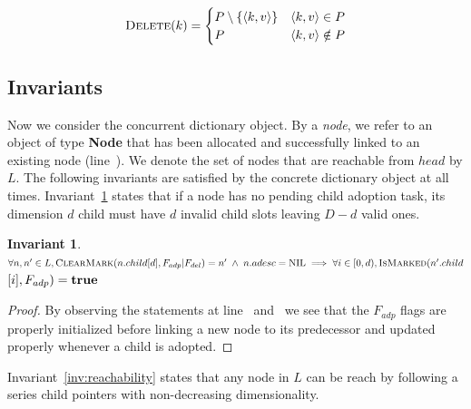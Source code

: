 \documentclass[10pt,conference,compsocconf]{IEEEtran}
\newtheorem{invariant}{Invariant}
\newcommand\NIL{\text{NIL}}
\newcommand\TRUE{\text{\textbf{true}}}
\begin{document}
\begin{gather}
    \label{eq:delete1}
    \textsc{Delete}(k)= \begin{cases}
        P \setminus \{\langle k,v \rangle\} & \langle k,v\rangle \in P\\
        P & \langle k,v\rangle \notin P
    \end{cases}
\end{gather}

\subsection{Invariants}
Now we consider the concurrent dictionary object. 
By a \emph{node}, we refer to an object of type \textbf{Node} that has been allocated and successfully linked to an existing node (line~). 
We denote the set of nodes that are reachable from $head$ by $L$. 
The following invariants are satisfied by the concrete dictionary object at all times. 
Invariant~\ref{inv:adpflag} states that if a node has no pending child adoption task, its dimension $d$ child must have $d$ invalid child slots leaving $D-d$ valid ones.

\begin{invariant} \label{inv:adpflag}
$\forall n,n' \in L,\textsc{ClearMark}(n.child[d],F_{adp}\linebreak|F_{del})=n'\;\land\;n.adesc=\NIL \implies \forall i \in [0,d), \textsc{IsMarked}(\linebreak n'.child$ $[i],F_{adp})=\TRUE$
\end{invariant}
\begin{proof}
    By observing the statements at line~ and~ we see that the $F_{adp}$ flags are properly initialized before linking a new node to its predecessor and updated properly whenever a child is adopted.
\end{proof}

Invariant~\ref{inv:reachability} states that any node in $L$ can be reach by following a series child pointers with non-decreasing dimensionality.
\end{document}
